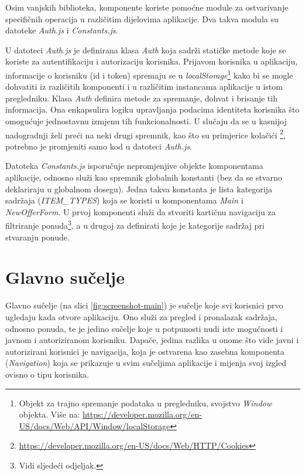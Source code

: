 \documentclass[times, utf8, zavrsni, numeric]{fer}
\begin{document}
Osim vanjskih biblioteka, komponente koriste pomoćne module za ostvarivanje specifičnih operacija u različitim dijelovima aplikacije.
Dva takva modula su datoteke \emph{Auth.js} i \emph{Constants.js}.

U datoteci \emph{Auth.js} je definirana klasa \emph{Auth} koja sadrži statičke metode koje se koriste za autentifikaciju i autorizaciju korisnika.
Prijavom korisnika u aplikaciju, informacije o korisniku (id i token) spremaju se u \emph{localStorage}\footnote{Objekt za trajno spremanje podataka u pregledniku, svojstvo \emph{Window} objekta. Više na: \url{https://developer.mozilla.org/en-US/docs/Web/API/Window/localStorage}} kako bi se mogle dohvatiti iz različitih komponenti i u različitim instancama aplikacije u istom pregledniku.
Klasa \emph{Auth} definira metode za spremanje, dohvat i brisanje tih informacija.
Ona enkapsulira logiku upravljanja podacima identiteta korisnika što omogućuje jednostavnu izmjenu tih funkcionalnosti.
U slučaju da se u kasnijoj nadogradnji želi preći na neki drugi spremnik, kao što su primjerice kolačići \footnote{\url{https://developer.mozilla.org/en-US/docs/Web/HTTP/Cookies}}, potrebno je promjeniti samo kod u datoteci \emph{Auth.js}.

Datoteka \emph{Constants.js} isporučuje nepromjenjive objekte komponentama aplikacije, odnosno služi kao spremnik globalnih konstanti (bez da se stvarno deklariraju u globalnom dosegu).
Jedna takva konstanta je lista kategorija sadržaja (\emph{ITEM\_TYPES}) koja se koristi u komponentama \emph{Main} i \emph{NewOfferForm}.
U prvoj komponenti služi da stvoriti kartičnu navigaciju za filtriranje ponuda\footnote{Vidi sljedeći odjeljak.}, a u drugoj za definirati koje je kategorije sadržaj pri stvaranju ponude.

\newpage


\section{Glavno sučelje}

Glavno sučelje (na slici \ref{fig:screenshot-main}) je sučelje koje svi korisnici prvo ugledaju kada otvore aplikaciju.
Ono služi za pregled i pronalazak sadržaja, odnosno ponuda, te je jedino sučelje koje u potpunosti nudi iste mogućnosti i javnom i autoriziranom korisniku.
Dapače, jedina razlika u onome što vide javni i autorizirani korisnici je navigacija, koja je ostvarena kao zasebna komponenta (\emph{Navigation}) koja se prikazuje u svim sučeljima aplikacije i mijenja svoj izgled ovisno o tipu korisnika.
\end{document}
